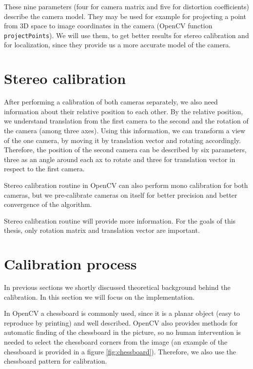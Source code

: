 These nine parameters (four for camera matrix and five for distortion
coefficients) describe the camera model. They may be used for example for
projecting a point from 3D space to image coordinates in the camera (OpenCV
function \verb+projectPoints+). We will use them, to get better results for
stereo calibration and for localization, since they provide us a more accurate
model of the camera.



\section{Stereo calibration}

After performing a calibration of both cameras separately, we also need
information about their relative position to each other. By the relative
position, we understand translation from the first camera to the second and the
rotation of the camera (among three axes). Using this information, we can
transform a view of the one camera, by moving it by translation vector and
rotating accordingly. Therefore, the position of the second camera can be
described by six parameters, three as an angle around each ax to rotate and
three for translation vector in respect to the first camera.

Stereo calibration routine in OpenCV can also perform mono calibration for both
cameras, but we pre-calibrate cameras on itself for better precision and better
convergence of the algorithm.

Stereo calibration routine will provide more information. For the goals of this
thesis, only rotation matrix and translation vector are important.

\section{Calibration process}

In previous sections we shortly discussed theoretical background behind the
calibration. In this section we will focus on the implementation.

In OpenCV a chessboard is commonly used, since it is a planar object (easy to
reproduce by printing) and well described. OpenCV also provides methods for
automatic finding of the chessboard in the picture, so no human intervention is
needed to select the chessboard corners from the image (an example of the
chessboard is provided in a figure \ref{fig:chessboard}). Therefore, we also
use the chessboard pattern for calibration.


